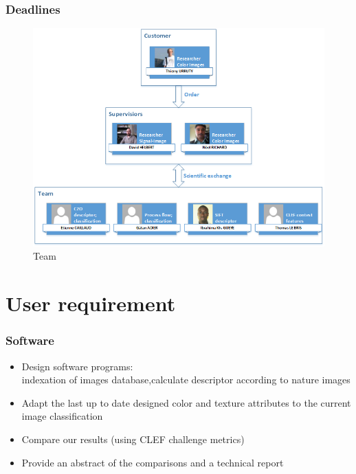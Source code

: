 \documentclass[xcolor=table]{beamer}
\begin{document}
\begin{frame} \frametitle{Deadlines}
\begin{figure}[h]
    \center
    \includegraphics[scale=0.5]{Dessin1.png}
    \caption{Team}\label{fig:team}
\end{figure}

\end{frame}

\section{User requirement}
\begin{frame} \frametitle{Software}
\begin{itemize}
 \item Design  software programs:\\
   indexation of  images database,calculate descriptor according to  nature images
\item Adapt the last up to date designed color and texture attributes to the current image classification
\item Compare our results (using CLEF challenge metrics)
\item Provide an abstract of the comparisons and a technical report
\end{itemize}






\end{frame}
\end{document}
